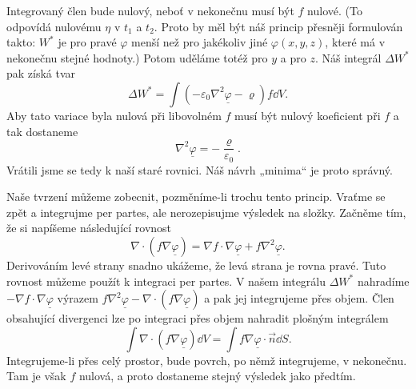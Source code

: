    Integrovaný člen bude nulový, neboť v nekonečnu musí být \(f\) nulové. (To odpovídá nulovému
    \(\eta\) v \(t_1\) a \(t_2\). Proto by měl být náš princip přesněji formulován takto: \(W^*\) je
    pro pravé \(\varphi\) menší než pro jakékoliv jiné \(\varphi(x, y, z)\), které má v nekonečnu
    stejné hodnoty.) Potom uděláme totéž pro \(y\) a pro \(z\). Náš integrál \(\Delta W^*\) pak
    získá tvar
    \begin{equation*}
      \Delta W^* = \int(-\varepsilon_0\nabla^2\underline{\varphi} - \varrho)f\dd{V}.
    \end{equation*}
    Aby tato variace byla nulová při libovolném \(f\) musí být nulový koeficient při \(f\) a tak
    dostaneme
    \begin{equation*}
      \nabla^2\underline{\varphi} = -\dfrac{\varrho}{\varepsilon_0}.
    \end{equation*}
    Vrátili jsme se tedy k naší staré rovnici. Náš návrh „minima“ je proto správný. 
    
    Naše tvrzení můžeme zobecnit, pozměníme-li trochu tento princip. Vraťme se zpět a integrujme per
    partes, ale nerozepisujme výsledek na složky. Začněme tím, že si napíšeme následující rovnost
    \begin{equation*}
      \nabla\cdot(f\nabla\underline{\varphi}) = \nabla f\cdot\nabla\underline{\varphi} +
      f\nabla^2\underline{\varphi}.
    \end{equation*}
    Derivováním levé strany snadno ukážeme, že levá strana je rovna pravé. Tuto rovnost můžeme
    použít k integraci per partes. V našem integrálu \(\Delta W^*\) nahradíme \(-\nabla
    f\cdot\nabla\underline{\varphi}\) výrazem \(f\nabla^2\underline{\varphi} -
    \nabla\cdot(f\nabla\underline{\varphi})\) a pak jej integrujeme přes objem. Člen obsahující
    divergenci lze po integraci přes objem nahradit plošným integrálem
    \begin{equation*}
      \int\nabla\cdot(f\nabla\underline{\varphi})\dd{V} = 
        \int f\nabla\underline{\varphi}\cdot\vec{n}\dd{S}.
    \end{equation*}
    Integrujeme-li přes celý prostor, bude povrch, po němž integrujeme, v nekonečnu. Tam je však
    \(f\) nulová, a proto dostaneme stejný výsledek jako předtím. 
    
